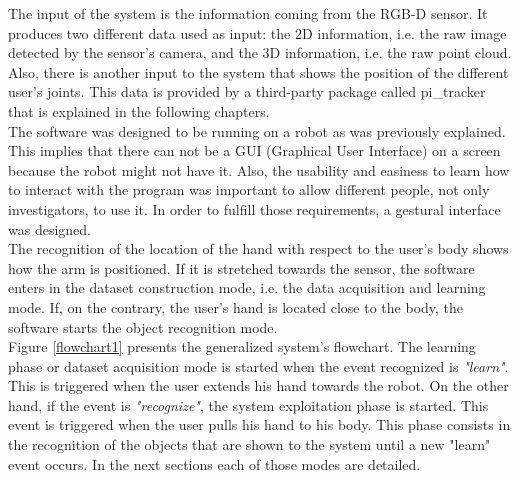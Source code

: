 The input of the system is the information coming from the RGB-D sensor. 
It produces two different data used as input: the 2D information, i.e. the raw image detected by the sensor's camera, and the 3D information, i.e. the raw point cloud. 
Also, there is another input to the system that shows the position of the different user's joints. This data is provided by a third-party package called pi\_tracker that is explained in the following chapters. 
\\

The software was designed to be running on a robot as was previously explained. 
This implies that there can not be a GUI (Graphical User Interface) on a screen because the robot might not have it. 
Also, the usability and easiness to learn how to interact with the program was important to allow different people, not only investigators, to use it. 
In order to fulfill those requirements, a gestural interface was designed. 
\\

The recognition of the location of the hand with respect to the user's body shows how the arm is positioned. 
If it is stretched towards the sensor, the software enters in the dataset construction mode, i.e. the data acquisition and learning mode. 
If, on the contrary, the user's hand is located close to the body, the software starts the object recognition mode. 
\\

Figure \ref{flowchart1} presents the generalized system's flowchart. 
The learning phase or dataset acquisition mode is started when the event recognized is \textit{"learn"}.
This is triggered when the user extends his hand towards the robot. 
On the other hand, if the event is \textit{"recognize"}, the system exploitation phase is started. 
This event is triggered when the user pulls his hand to his body.
This phase consists in the recognition of the objects that are shown to the system until a new "learn" event occurs. 
In the next sections each of those modes are detailed. 
\newpage

